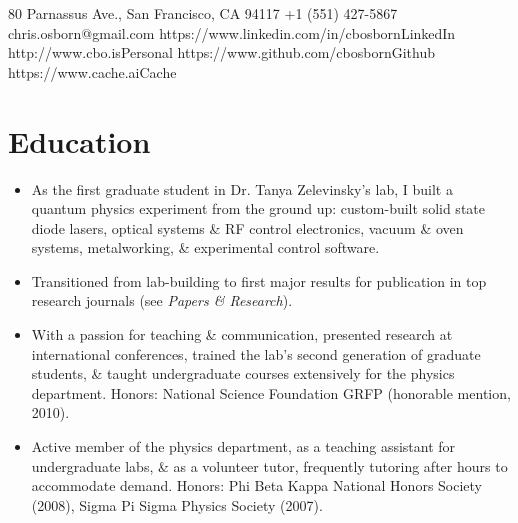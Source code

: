 \documentclass{resume}
\begin{document}
\contact
	{80 Parnassus Ave., San Francisco, CA 94117}
	{+1 (551) 427-5867}
	{chris.osborn@gmail.com}
\sites
	{https://www.linkedin.com/in/cbosborn}{LinkedIn}
	{http://www.cbo.is}{Personal}
	{https://www.github.com/cbosborn}{Github}
	{https://www.cache.ai}{Cache}
\section{Education}
	\begin{itemize}
	\item As the first graduate student in Dr. Tanya Zelevinsky's lab, I built a quantum physics experiment from the ground up: custom-built solid state diode lasers, optical systems \& RF control electronics, vacuum \& oven systems, metalworking, \& experimental control software.
	\item Transitioned from lab-building to first major results for publication in top research journals (see \textit{Papers \& Research}).
	\item With a passion for teaching \& communication, presented research at international conferences, trained the lab's second generation of graduate students, \& taught undergraduate courses extensively for the physics department.
	\note
		{Honors:}
		{National Science Foundation GRFP (honorable mention, 2010).}
	\end{itemize}

	\begin{itemize}
		\item Active member of the physics department, as a teaching assistant for undergraduate labs, \& as a volunteer tutor, frequently tutoring after hours to accommodate demand.
		\note
			{Honors:}
			{Phi Beta Kappa National Honors Society (2008), Sigma Pi Sigma Physics Society (2007).}
	\end{itemize}
\end{document}
